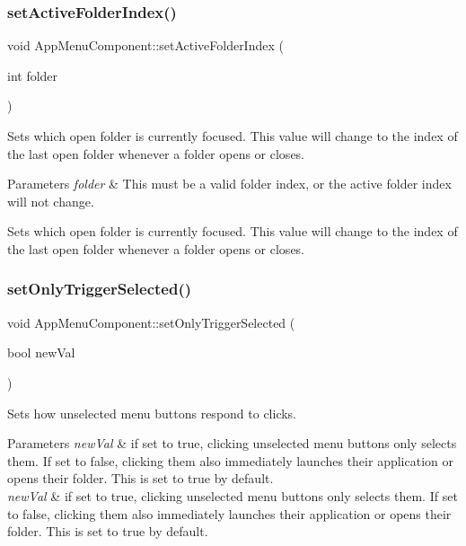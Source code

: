 \subsubsection{\texorpdfstring{set\+Active\+Folder\+Index()}{setActiveFolderIndex()}}
{\footnotesize\ttfamily void App\+Menu\+Component\+::set\+Active\+Folder\+Index (\begin{DoxyParamCaption}\item[{int}]{folder }\end{DoxyParamCaption})\hspace{0.3cm}{\ttfamily [protected]}}

Sets which open folder is currently focused. This value will change to the index of the last open folder whenever a folder opens or closes.


\begin{DoxyParams}{Parameters}
{\em folder} & This must be a valid folder index, or the active folder index will not change.\\
\hline
\end{DoxyParams}
Sets which open folder is currently focused. This value will change to the index of the last open folder whenever a folder opens or closes. \mbox{\label{classAppMenuComponent_aadc7aa3e03fa89fd6dc9d0c73b46f644}} 
\subsubsection{\texorpdfstring{set\+Only\+Trigger\+Selected()}{setOnlyTriggerSelected()}}
{\footnotesize\ttfamily void App\+Menu\+Component\+::set\+Only\+Trigger\+Selected (\begin{DoxyParamCaption}\item[{bool}]{new\+Val }\end{DoxyParamCaption})\hspace{0.3cm}{\ttfamily [protected]}}

Sets how unselected menu buttons respond to clicks.


\begin{DoxyParams}{Parameters}
{\em new\+Val} & if set to true, clicking unselected menu buttons only selects them. If set to false, clicking them also immediately launches their application or opens their folder. This is set to true by default.\\
\hline
{\em new\+Val} & if set to true, clicking unselected menu buttons only selects them. If set to false, clicking them also immediately launches their application or opens their folder. This is set to true by default. \\
\hline
\end{DoxyParams}


